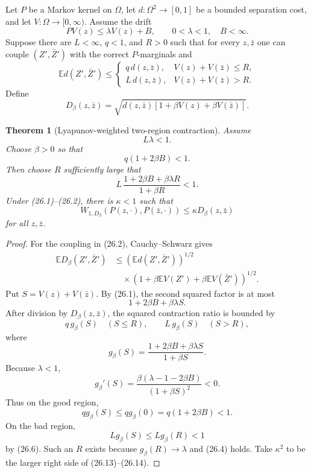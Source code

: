 \documentclass[11pt]{article}
\newtheorem{theorem}{Theorem}[section]
\theoremstyle{remark}
\begin{document}
Let \(P\) be a Markov kernel on \(\Omega\), let
\(d:\Omega^2\to[0,1]\) be a bounded separation cost, and let
\(V:\Omega\to[0,\infty)\).  Assume the drift
\[
 PV(z)\le\lambda V(z)+B,\qquad 0<\lambda<1,\quad B<\infty.   \tag{26.1}
\]
Suppose there are \(L<\infty\), \(q<1\), and \(R>0\) such that
for every \(z,\bar z\) one can couple
\((Z',\bar Z')\) with the correct \(P\)-marginals and
\[
 \mathbb E d(Z',\bar Z')
 \le
 \begin{cases}
 q\,d(z,\bar z),
   &V(z)+V(\bar z)\le R,\\
 L\,d(z,\bar z),
   &V(z)+V(\bar z)>R.
 \end{cases}                                                \tag{26.2}
\]
Define
\[
 D_\beta(z,\bar z)
 =
 \sqrt{
 d(z,\bar z)
 [1+\beta V(z)+\beta V(\bar z)]
 }.                                                         \tag{26.3}
\]

\begin{theorem}[Lyapunov-weighted two-region contraction]
\label{thm:v15v26-compiler}
Assume
\[
 L\lambda<1.                                                \tag{26.4}
\]
Choose \(\beta>0\) so that
\[
 q(1+2\beta B)<1.                                          \tag{26.5}
\]
Then choose \(R\) sufficiently large that
\[
 L\,
 \frac{1+2\beta B+\beta\lambda R}
      {1+\beta R}<1.                                       \tag{26.6}
\]
Under (26.1)--(26.2), there is \(\kappa<1\) such that
\[
 \boxed{
 W_{1,D_\beta}(P(z,\cdot),P(\bar z,\cdot))
 \le\kappa D_\beta(z,\bar z)}                              \tag{26.7}
\]
for all \(z,\bar z\).
\end{theorem}

\begin{proof}
For the coupling in (26.2), Cauchy--Schwarz gives
\[
\begin{aligned}
 \mathbb E D_\beta(Z',\bar Z')
 &\le
 \left(\mathbb E d(Z',\bar Z')\right)^{1/2}\\
 &\quad\times
 \left(
 1+\beta\mathbb EV(Z')+\beta\mathbb EV(\bar Z')
 \right)^{1/2}.                                            \tag{26.8}
\end{aligned}
\]
Put \(S=V(z)+V(\bar z)\).  By (26.1), the second squared
factor is at most
\[
 1+2\beta B+\beta\lambda S.                                \tag{26.9}
\]
After division by \(D_\beta(z,\bar z)\), the squared contraction
ratio is bounded by
\[
 q\,g_\beta(S)\quad(S\le R),\qquad
 L\,g_\beta(S)\quad(S>R),                                  \tag{26.10}
\]
where
\[
 g_\beta(S)
 =
 \frac{1+2\beta B+\beta\lambda S}{1+\beta S}.               \tag{26.11}
\]
Because \(\lambda<1\),
\[
 g_\beta'(S)
 =
 \frac{\beta(\lambda-1-2\beta B)}
      {(1+\beta S)^2}<0.                                   \tag{26.12}
\]
Thus on the good region,
\[
 qg_\beta(S)\le qg_\beta(0)=q(1+2\beta B)<1.                \tag{26.13}
\]
On the bad region,
\[
 Lg_\beta(S)\le Lg_\beta(R)<1                              \tag{26.14}
\]
by (26.6).  Such an \(R\) exists because
\(g_\beta(R)\to\lambda\) and (26.4) holds.  Take
\(\kappa^2\) to be the larger right side of
(26.13)--(26.14).
\end{proof}
\end{document}
